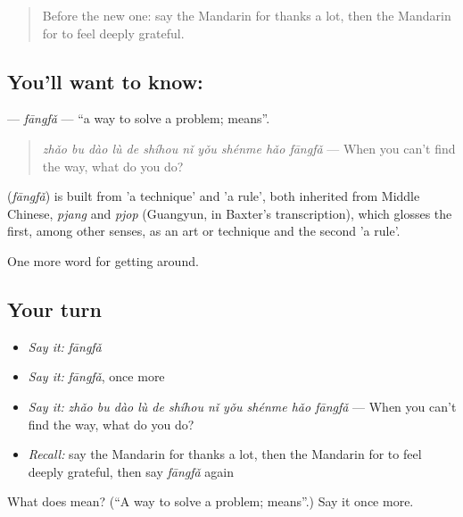 \label{lesson:ZH-C457-fangfa}



\begin{quote}
Before the new one: say the Mandarin for thanks a lot, then the Mandarin for to feel deeply grateful.
\end{quote}

\subsection*{You'll want to know: }
\textbf{} — \emph{fāngfǎ} — \textquotedblleft{}a way to solve a problem; means\textquotedblright{}.

\begin{quote}
\textbf{} \emph{zhǎo bu dào lù de shíhou nǐ yǒu shénme hǎo fāngfǎ} — When you can't find the way, what do you do?
\end{quote}

\begin{cousinweb}
\textbf{} (\emph{fāngfǎ}) is built from  'a technique' and  'a rule', both inherited from Middle Chinese, \emph{pjang} and \emph{pjop} (Guangyun, in Baxter's transcription), which glosses the first, among other senses, as an art or technique and the second 'a rule'.
\end{cousinweb}

\begin{grammarlens}[title={What you've built}]
One more word for getting around.
\end{grammarlens}

\subsection*{Your turn}
\begin{itemize}
\raggedright
  \item \emph{Say it:} \emph{fāngfǎ}
  \item \emph{Say it:} \emph{fāngfǎ}, once more
  \item \emph{Say it:} \emph{zhǎo bu dào lù de shíhou nǐ yǒu shénme hǎo fāngfǎ} — When you can't find the way, what do you do?
  \item \emph{Recall:} say the Mandarin for thanks a lot, then the Mandarin for to feel deeply grateful, then say \emph{fāngfǎ} again
\end{itemize}

\begin{tcolorbox}[breakable,colback=teal!4,colframe=teal!35!black,title={Before you move on}]
What does  mean? (\textquotedblleft{}A way to solve a problem; means\textquotedblright{}.) Say it once more.
\end{tcolorbox}
